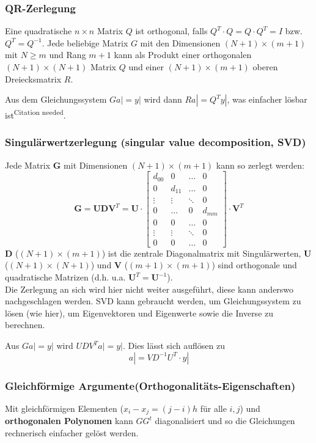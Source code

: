 \subsubsection{QR-Zerlegung}
Eine quadratische $n \times n$ Matrix $Q$ ist orthogonal, falls $Q^T \cdot Q = Q \cdot Q^T = I$ bzw. $Q^T = Q^{-1}$.
Jede beliebige Matrix $G$ mit den Dimensionen $(N+1) \times (m+1)$ mit $N \geq m$ und Rang $m+1$ kann als
Produkt einer orthogonalen $(N+1)\times(N+1)$ Matrix $Q$ und einer $(N+1)\times(m+1)$ oberen Dreiecksmatrix $R$.

Aus dem Gleichungssystem $Ga| = y|$ wird dann $Ra|=Q^Ty|$, was einfacher lösbar ist\textsuperscript{Citation needed}.

\subsubsection{Singulärwertzerlegung (singular value decomposition, SVD)}
Jede Matrix $\bm G$ mit Dimensionen $(N+1) \times (m+1)$ kann so zerlegt werden:
$$\bm G = \bm U \bm D \bm V^T = \bm U \cdot \begin{bmatrix}
  d_{00} & 0      & \ldots & 0\\
  0      & d_{11} & \ldots & 0\\
  \vdots & \vdots & \ddots & 0\\
  0      & \ldots & 0      & d_{mm}\\
  0      & 0      & \ldots & 0\\
  \vdots & \vdots & \ddots & 0\\
  0      & 0      & \ldots & 0
\end{bmatrix} \cdot \bm V^T$$
$\bm D$ ($(N+1) \times (m+1)$) ist die zentrale Diagonalmatrix mit Singulärwerten,
$\bm U$ ($(N+1) \times (N+1)$) und $\bm V$ ($(m+1) \times (m+1)$) sind orthogonale und quadratische
Matrizen (d.h. u.a. $\bm U^T=\bm U^{-1}$).\\

Die Zerlegung an sich wird hier nicht weiter ausgeführt, diese kann anderswo nachgeschlagen werden.
SVD kann gebraucht werden, um Gleichungssystem zu lösen (wie hier), um Eigenvektoren und Eigenwerte 
sowie die Inverse zu berechnen.

Aus $Ga|=y|$ wird $UDV^T a|=y|$. Dies lässt sich auflösen zu
\[
    a| = V D^{-1}U^T \cdot y|
\]

\subsubsection{Gleichförmige Argumente\quad (Orthogonalitäts-Eigenschaften)} 
Mit gleichförmigen Elementen ($x_i - x_j = (j-i) h$ für alle $i,j$) und \textbf{orthogonalen Polynomen} kann 
$G G^t$ diagonalisiert und so die Gleichungen rechnerisch einfacher gelöst werden. 

